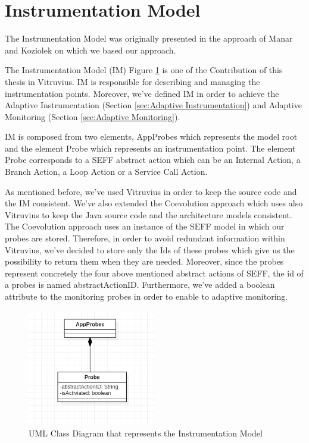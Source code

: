 \section{Instrumentation Model}
\label{sec:Instrumentation Model}
The Instrumentation Model was originally presented in the approach of Manar and Koziolek \cite{mazkatli2018continuous} on which we based our approach. 

The Instrumentation Model (IM) Figure \ref{fig:im} is one of the Contribution of this thesis in Vitruvius. IM is responsible for describing and managing the instrumentation points. Moreover, we've defined IM in order to achieve the Adaptive Instrumentation (Section \ref{sec:Adaptive Instrumentation}) and Adaptive Monitoring (Section \ref{sec:Adaptive Monitoring}).

IM is composed from two elements, AppProbes which represents the model root and the element Probe which represents an instrumentation point. The element Probe corresponds to a SEFF abstract action which can be an Internal Action, a Branch Action, a Loop Action or a Service Call Action.

As mentioned before, we’ve used Vitruvius in order to keep the source code and the IM consistent. We've also extended the Coevolution approach which uses also Vitruvius to keep the Java source code and the architecture models consistent. The Coevolution approach uses an instance of the SEFF model in which our probes are stored. Therefore, in order to avoid redundant information within Vitruvius, we've decided to store only the Ids of these probes which give us the possibility to return them when they are needed. Moreover, since the probes represent concretely the four above mentioned abstract actions of SEFF, the id of a probes is named abstractActionID. Furthermore, we've added a boolean attribute to the monitoring probes in order to enable to adaptive monitoring. 

\begin{figure}[h]
\centering
\includegraphics[width=0.5\textwidth]{figures/im}
\caption{UML Class Diagram that represents the Instrumentation Model}
\label{fig:im}
\end{figure}


